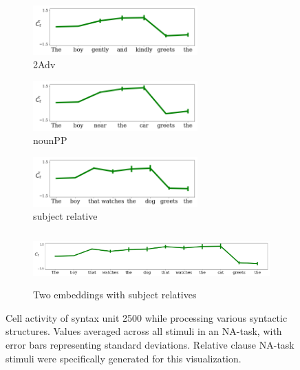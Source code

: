 \begin{figure}[ht!]
    \begin{subfigure}{0.32\textwidth}
            \centering
            \includegraphics[width=\linewidth, height=1.9cm]{Figures/adv_conjunction_1149_cell}
            \caption{2Adv}
            \label{fig:syntax-unit-2Adv}
    \end{subfigure}
    \begin{subfigure}{0.32\textwidth}
            \centering
            \includegraphics[width=\linewidth, height=1.9cm]{Figures/nounpp_1149_cell.png}
            \caption{nounPP}
            \label{fig:syntax-unit-nounpp}
    \end{subfigure}
    \begin{subfigure}{0.32\textwidth}
            \centering
            \includegraphics[width=\linewidth, height=1.9cm]{Figures/subjrel_that_1149_cell.png}
            \caption{subject relative}
            \label{fig:syntax-unit-subjrel}
    \end{subfigure}
    \begin{subfigure}{\textwidth}
            \centering
            \includegraphics[width=\linewidth, height=2cm]{Figures/double_subjrel_that_1149_cell.png}
            \caption{Two embeddings with subject relatives}
            \label{fig:syntax-unit-double-subjrel}
    \end{subfigure}
\caption{Cell activity of syntax unit \unit{2}{500} while processing various syntactic structures. Values averaged across all stimuli in an NA-task, with error bars representing standard deviations. Relative clause NA-task stimuli were specifically generated for this visualization.}
\end{figure}

